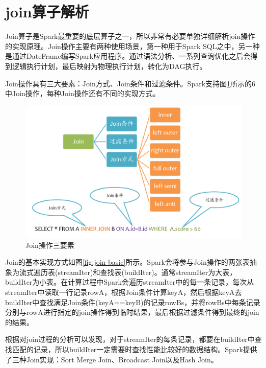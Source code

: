 \section{join算子解析}

Join算子是Spark最重要的底层算子之一，所以非常有必要单独详细解析join操作的实现原理。Join操作主要有两种使用场景，第一种用于Spark SQL之中，另一种是通过DateFrame编写Spark应用程序。通过语法分析、一系列查询优化之后会得到逻辑执行计划，最后映射为物理执行计划，转化为DAG执行。

Join操作具有三大要素：Join方式、Join条件和过滤条件。Spark支持图\ref{fig:join-overview}所示的6中Join操作，每种Join操作还有不同的实现方式。


\begin{figure}[htbp]
    \centering
    \includegraphics[width=1\textwidth]{Img/spark-sql-join-overview.png}
    \caption{Join操作三要素}
    \label{fig:join-overview}
\end{figure}

Join的基本实现方式如图\ref{fig:join-basic}所示。Spark会将参与Join操作的两张表抽象为流式遍历表(streamIter)和查找表(buildIter)。通常streamIter为大表，buildIter为小表。在计算过程中Spark会遍历streamIter中的每一条记录，每次从streamIter中读取一行记录rowA，根据Join条件计算keyA，然后根据keyA去buildIter中查找满足Join条件(keyA==keyB)的记录rowBs，并将rowBs中每条记录分别与rowA进行指定的join操作得到临时结果，最后根据过滤条件得到最终的join的结果。

根据对join过程的分析可以发现，对于streamIter的每条记录，都要在buildIter中查找匹配的记录，所以buildIter一定需要时查找性能比较好的数据结构。Spark提供了三种Join实现：Sort Merge Join、Broadcast Join以及Hash Join。

